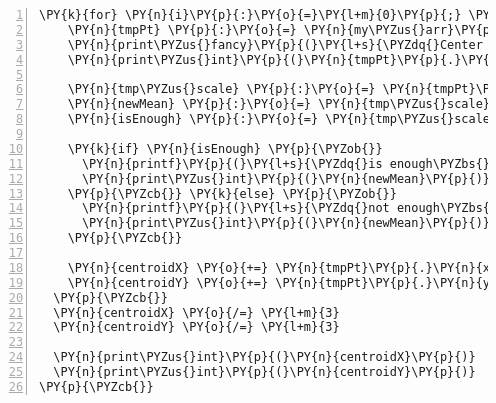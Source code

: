 \begin{Verbatim}[commandchars=\\\{\},numbers=left,firstnumber=1,stepnumber=1]
  \PY{k}{for} \PY{n}{i}\PY{p}{:}\PY{o}{=}\PY{l+m}{0}\PY{p}{;} \PY{n}{i} \PY{o}{\PYZlt{}} \PY{l+m}{3} \PY{p}{;} \PY{n}{i}\PY{o}{+=}\PY{l+m}{1}\PY{p}{\PYZob{}}
    \PY{n}{tmpPt} \PY{p}{:}\PY{o}{=} \PY{n}{my\PYZus{}arr}\PY{p}{[}\PY{n}{i}\PY{p}{]}
    \PY{n}{print\PYZus{}fancy}\PY{p}{(}\PY{l+s}{\PYZdq{}Center for Point: \PYZdq{}}\PY{p}{,}\PY{l+m}{21}\PY{p}{,}\PY{l+m}{0}\PY{p}{,}\PY{k+kc}{false}\PY{p}{,}\PY{k+kc}{true}\PY{p}{)}
    \PY{n}{print\PYZus{}int}\PY{p}{(}\PY{n}{tmpPt}\PY{p}{.}\PY{n}{calcDist}\PY{p}{(}\PY{p}{)}\PY{p}{)}

    \PY{n}{tmp\PYZus{}scale} \PY{p}{:}\PY{o}{=} \PY{n}{tmpPt}\PY{p}{.}\PY{n}{withScaleEnough}\PY{p}{(}\PY{l+m}{30}\PY{p}{)}
    \PY{n}{newMean} \PY{p}{:}\PY{o}{=} \PY{n}{tmp\PYZus{}scale}\PY{p}{[}\PY{l+m}{0}\PY{p}{]}
    \PY{n}{isEnough} \PY{p}{:}\PY{o}{=} \PY{n}{tmp\PYZus{}scale}\PY{p}{[}\PY{l+m}{1}\PY{p}{]}

    \PY{k}{if} \PY{n}{isEnough} \PY{p}{\PYZob{}}
      \PY{n}{printf}\PY{p}{(}\PY{l+s}{\PYZdq{}is enough\PYZbs{}nmean: \PYZdq{}}\PY{p}{)}
      \PY{n}{print\PYZus{}int}\PY{p}{(}\PY{n}{newMean}\PY{p}{)}
    \PY{p}{\PYZcb{}} \PY{k}{else} \PY{p}{\PYZob{}}
      \PY{n}{printf}\PY{p}{(}\PY{l+s}{\PYZdq{}not enough\PYZbs{}nmean: \PYZdq{}}\PY{p}{)}
      \PY{n}{print\PYZus{}int}\PY{p}{(}\PY{n}{newMean}\PY{p}{)}
    \PY{p}{\PYZcb{}}

    \PY{n}{centroidX} \PY{o}{+=} \PY{n}{tmpPt}\PY{p}{.}\PY{n}{x}
    \PY{n}{centroidY} \PY{o}{+=} \PY{n}{tmpPt}\PY{p}{.}\PY{n}{y}
  \PY{p}{\PYZcb{}}
  \PY{n}{centroidX} \PY{o}{/=} \PY{l+m}{3}
  \PY{n}{centroidY} \PY{o}{/=} \PY{l+m}{3}

  \PY{n}{print\PYZus{}int}\PY{p}{(}\PY{n}{centroidX}\PY{p}{)}
  \PY{n}{print\PYZus{}int}\PY{p}{(}\PY{n}{centroidY}\PY{p}{)}
\PY{p}{\PYZcb{}}
\end{Verbatim}
